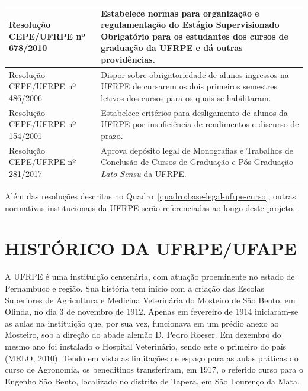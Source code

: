\documentclass[
	12pt,				%
	openright,			%
  oneside,     %
	a4paper,			%
	chapter=TITLE,		%
	english,			%
	french,				%
	spanish,			%
	brazil				%
	]{abntex2}
\begin{document}
\begin{center}
\begin{scriptsize}
\begin{longtable}{@{}lp{8.7cm}}
    Resolução CEPE/UFRPE nº 678/2010 & Estabelece normas para organização e regulamentação do Estágio Supervisionado Obrigatório para os estudantes dos cursos de graduação da UFRPE e dá outras providências. \\ \midrule
    Resolução CEPE/UFRPE nº 486/2006 & Dispor sobre obrigatoriedade de alunos ingressos na UFRPE de cursarem os dois primeiros semestres letivos dos cursos para os quais se habilitaram. \\ \midrule
    Resolução CEPE/UFRPE nº 154/2001 & Estabelece critérios para desligamento de alunos da UFRPE por insuficiência de rendimentos e discurso de prazo. \\ \midrule
    Resolução CEPE/UFRPE nº 281/2017 & Aprova depósito legal de Monografias e Trabalhos de Conclusão de Cursos de Graduação e Pós-Graduação \textit{Lato Sensu} da UFRPE.\\
    \bottomrule
    \end{longtable}
\end{scriptsize}     
\end{center}

Além das resoluções descritas no Quadro~\ref{quadro:base-legal-ufrpe-curso}, outras normativas institucionais da UFRPE serão referenciadas ao longo deste projeto.


\chapter{HISTÓRICO DA UFRPE/UFAPE}

A UFRPE é uma instituição centenária, com atuação proeminente no estado de Pernambuco e região. Sua história tem início com a criação das Escolas Superiores de Agricultura e Medicina Veterinária do Mosteiro de São Bento, em Olinda, no dia 3 de novembro de 1912. Apenas em fevereiro de 1914 iniciaram-se as aulas na instituição que, por sua vez, funcionava em um prédio anexo ao Mosteiro, sob a direção do abade alemão D. Pedro Roeser. Em dezembro do mesmo ano foi instalado o Hospital Veterinário, sendo este o primeiro do país (MELO, 2010). Tendo em vista as limitações de espaço para as aulas práticas do curso de Agronomia, os beneditinos transferiram, em 1917, o referido curso para o Engenho São Bento, localizado no distrito de Tapera, em São Lourenço da Mata.
\end{document}

